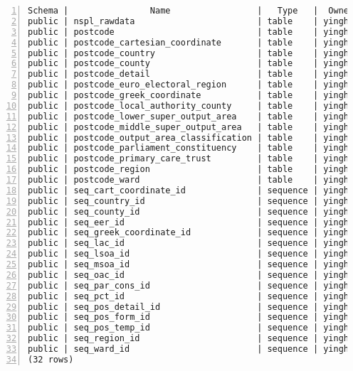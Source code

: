 \lstset{basicstyle=\ttfamily\tiny}  
\begin{lstlisting}[breaklines, frame=single, numbers=left, caption={List all relations in Postcode database.}, label=commandline-02]
Schema |                Name                 |   Type   |  Owner  |    Size    | -------+-------------------------------------+----------+---------+------------+
public | nspl_rawdata                        | table    | yinghua | 1403 MB    | 
public | postcode                            | table    | yinghua | 0 bytes    | 
public | postcode_cartesian_coordinate       | table    | yinghua | 0 bytes    | 
public | postcode_country                    | table    | yinghua | 0 bytes    | 
public | postcode_county                     | table    | yinghua | 0 bytes    | 
public | postcode_detail                     | table    | yinghua | 0 bytes    | 
public | postcode_euro_electoral_region      | table    | yinghua | 8192 bytes | 
public | postcode_greek_coordinate           | table    | yinghua | 0 bytes    | 
public | postcode_local_authority_county     | table    | yinghua | 0 bytes    | 
public | postcode_lower_super_output_area    | table    | yinghua | 0 bytes    | 
public | postcode_middle_super_output_area   | table    | yinghua | 0 bytes    | 
public | postcode_output_area_classification | table    | yinghua | 0 bytes    | 
public | postcode_parliament_constituency    | table    | yinghua | 0 bytes    | 
public | postcode_primary_care_trust         | table    | yinghua | 0 bytes    | 
public | postcode_region                     | table    | yinghua | 0 bytes    | 
public | postcode_ward                       | table    | yinghua | 0 bytes    | 
public | seq_cart_coordinate_id              | sequence | yinghua | 8192 bytes | 
public | seq_country_id                      | sequence | yinghua | 8192 bytes | 
public | seq_county_id                       | sequence | yinghua | 8192 bytes | 
public | seq_eer_id                          | sequence | yinghua | 8192 bytes | 
public | seq_greek_coordinate_id             | sequence | yinghua | 8192 bytes | 
public | seq_lac_id                          | sequence | yinghua | 8192 bytes | 
public | seq_lsoa_id                         | sequence | yinghua | 8192 bytes | 
public | seq_msoa_id                         | sequence | yinghua | 8192 bytes | 
public | seq_oac_id                          | sequence | yinghua | 8192 bytes | 
public | seq_par_cons_id                     | sequence | yinghua | 8192 bytes | 
public | seq_pct_id                          | sequence | yinghua | 8192 bytes | 
public | seq_pos_detail_id                   | sequence | yinghua | 8192 bytes | 
public | seq_pos_form_id                     | sequence | yinghua | 8192 bytes | 
public | seq_pos_temp_id                     | sequence | yinghua | 8192 bytes | 
public | seq_region_id                       | sequence | yinghua | 8192 bytes | 
public | seq_ward_id                         | sequence | yinghua | 8192 bytes | 
(32 rows)

\end{lstlisting}

